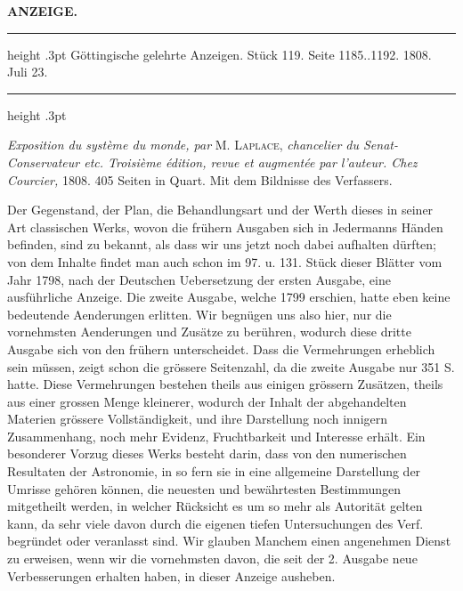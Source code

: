 \clearpage
\thispagestyle{empty}
\noindent{}%
%
\parbox[t]{\dimexpr\linewidth-24mm\relax}{\centering\footnotesize\bfseries ANZEIGE.\par}%
\makebox[12mm][r]{}\par\nobreak\medskip
\begin{center}
\parbox{.83\linewidth}{%
\centering\small
\hrule height .3pt\relax\vspace{2.5pt}
Göttingische gelehrte Anzeigen. Stück 119. Seite 1185..1192. 1808. Juli 23.\par
\vspace{2.5pt}\hrule height .3pt\relax
}
\end{center}

\emph{Exposition du système du monde, par} M. \textsc{Laplace}, \emph{chancelier du Senat-Conservateur etc. Troisième édition, revue et augmentée par l'auteur. Chez Courcier,} 1808. 405 Seiten in Quart. Mit dem Bildnisse des Verfassers.

Der Gegenstand, der Plan, die Behandlungsart und der Werth dieses in seiner Art classischen Werks, wovon die frühern Ausgaben sich in Jedermanns Händen befinden, sind zu bekannt, als dass wir uns jetzt noch dabei aufhalten dürften; von dem Inhalte findet man auch schon im 97. u. 131. Stück dieser Blätter vom Jahr 1798, nach der Deutschen Uebersetzung der ersten Ausgabe, eine ausführliche Anzeige. Die zweite Ausgabe, welche 1799 erschien, hatte eben keine bedeutende Aenderungen erlitten. Wir begnügen uns also hier, nur die vornehmsten Aenderungen und Zusätze zu berühren, wodurch diese dritte Ausgabe sich von den frühern unterscheidet. Dass die Vermehrungen erheblich sein müssen, zeigt schon die grössere Seitenzahl, da die zweite Ausgabe nur 351 S. hatte. Diese Vermehrungen bestehen theils aus einigen grössern Zusätzen, theils aus einer grossen Menge kleinerer, wodurch der Inhalt der abgehandelten Materien grössere Vollständigkeit, und ihre Darstellung noch innigern Zusammenhang, noch mehr Evidenz, Fruchtbarkeit und Interesse erhält. Ein besonderer Vorzug dieses Werks besteht darin, dass von den numerischen Resultaten der Astronomie, in so fern sie in eine allgemeine Darstellung der Umrisse gehören können, die neuesten und bewährtesten Bestimmungen mitgetheilt werden, in welcher Rücksicht es um so mehr als Autorität gelten kann, da sehr viele davon durch die eigenen tiefen Untersuchungen des Verf. begründet oder veranlasst sind. Wir glauben Manchem einen angenehmen Dienst zu erweisen, wenn wir die vornehmsten davon, die seit der 2. Ausgabe neue Verbesserungen erhalten haben, in dieser Anzeige ausheben. 

